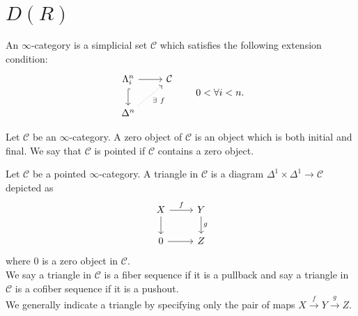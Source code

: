 \documentclass[UTF8,12,a4paper]{ctexart}
\theoremstyle{definition}
\begin{document}
\newpage
\section{$D(R)$}
\dfn
An $\infty$-category is a simplicial set $\mathcal{C}$ which satisfies the following extension condition:
\begin{equation*}
\begin{tikzcd}
\Lambda^n_i \arrow[r] \arrow[d, hook]      & \mathcal{C} \\
\Delta^n \arrow[ru, "\exists\ f"', dotted] &            
\end{tikzcd}
\quad\quad 0<\forall i<n.
\end{equation*}

\dfn 
Let $\mathcal{C}$ be an $\infty$-category. A zero object of $\mathcal{C}$ is an object which is both initial and final. We say that $\mathcal{C}$ is pointed if $\mathcal{C}$ contains a zero object.

\dfn 
Let $\mathcal{C}$ be a pointed $\infty$-category. A triangle in $\mathcal{C}$ is a diagram $\Delta^1 \times\Delta^1\rightarrow\mathcal{C}$ depicted as
\begin{equation*}
\begin{tikzcd}
X \arrow[r, "f"] \arrow[d] & Y \arrow[d, "g"] \\
0 \arrow[r]                & Z               
\end{tikzcd}
\end{equation*}
where 0 is a zero object in $\mathcal{C}$.\\
We say a triangle in $\mathcal{C}$ is a fiber sequence if it is a pullback and say a triangle in $\mathcal{C}$ is a cofiber sequence if it is a pushout.\\
We generally indicate a triangle by specifying only the pair of maps $X\stackrel{f}{\longrightarrow}Y\stackrel{g}{\longrightarrow}Z.$
\end{document}
